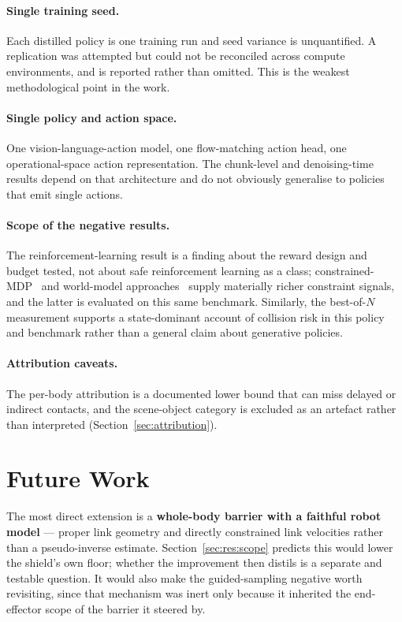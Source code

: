 \documentclass[a4paper,11pt]{report}
\begin{document}
\paragraph{Single training seed.}
Each distilled policy is one training run and seed variance is unquantified. A replication was
attempted but could not be reconciled across compute environments, and is reported rather than
omitted. This is the weakest methodological point in the work.

\paragraph{Single policy and action space.}
One vision-language-action model, one flow-matching action head, one operational-space action
representation. The chunk-level and denoising-time results depend on that architecture and do not
obviously generalise to policies that emit single actions.

\paragraph{Scope of the negative results.}
The reinforcement-learning result is a finding about the reward design and budget tested, not about
safe reinforcement learning as a class; constrained-MDP~\cite{safevla} and world-model
approaches~\cite{safedojo} supply materially richer constraint signals, and the latter is evaluated
on this same benchmark. Similarly, the best-of-$N$ measurement supports a state-dominant account of
collision risk in this policy and benchmark rather than a general claim about generative policies.

\paragraph{Attribution caveats.}
The per-body attribution is a documented lower bound that can miss delayed or indirect contacts,
and the scene-object category is excluded as an artefact rather than interpreted
(Section~\ref{sec:attribution}).

\section{Future Work}\label{sec:disc:future}

The most direct extension is a \textbf{whole-body barrier with a faithful robot model} --- proper
link geometry and directly constrained link velocities rather than a pseudo-inverse estimate.
Section~\ref{sec:res:scope} predicts this would lower the shield's own floor; whether the
improvement then distils is a separate and testable question. It would also make the guided-sampling
negative worth revisiting, since that mechanism was inert only because it inherited the
end-effector scope of the barrier it steered by.
\end{document}
